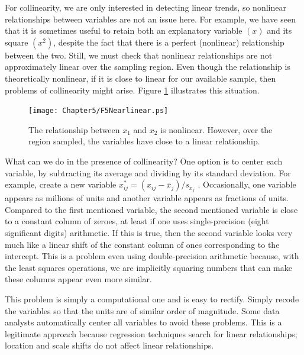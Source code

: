 \linejed

For collinearity, we are only interested in detecting linear trends,
so nonlinear relationships between variables are not an issue here.
For example, we have seen that it is sometimes useful to retain both
an explanatory variable $(x)$ and its square $(x^2)$, despite the
fact that there is a perfect (nonlinear) relationship between the
two. Still, we must check that nonlinear relationships are not
approximately linear over the sampling region. Even though the
relationship is theoretically nonlinear, if it is close to linear
for our available sample, then problems of collinearity might arise.
Figure \ref{F5:Nearlinear} illustrates this situation.


\begin{figure}[htp]
  \begin{center}
    \texttt{[image: Chapter5/F5Nearlinear.ps]}
    \caption{\label{F5:Nearlinear} \small  The relationship
between $x_1$ and $x_2$ is nonlinear. However, over the region
sampled, the variables have close to a linear relationship.}
  \end{center}
\end{figure}



What can we do in the presence of collinearity? One option is to center each
variable, by subtracting its average and dividing by its standard deviation.
For example, create a new variable $x_{ij}^{\ast }=(x_{ij}-\bar{x}%
_j)/s_{x_j}$ . Occasionally, one variable appears as millions of
units and another variable appears as fractions of units. Compared
to the first mentioned variable, the second mentioned variable is
close to a constant column of zeroes, at least if one uses
single-precision (eight significant digits) arithmetic. If this is
true, then the second variable looks very much like a linear shift
of the constant column of ones corresponding to the intercept. This
is a problem even using double-precision arithmetic because, with
the least squares operations, we are implicitly squaring numbers
that can make these columns appear even more similar.

This problem is simply a computational one and is easy to rectify.
Simply recode the variables so that the units are of similar order
of magnitude. Some data analysts automatically center all variables
to avoid these problems. This is a legitimate approach because
regression techniques search for linear relationships; location
 and scale shifts do not affect linear relationships.

